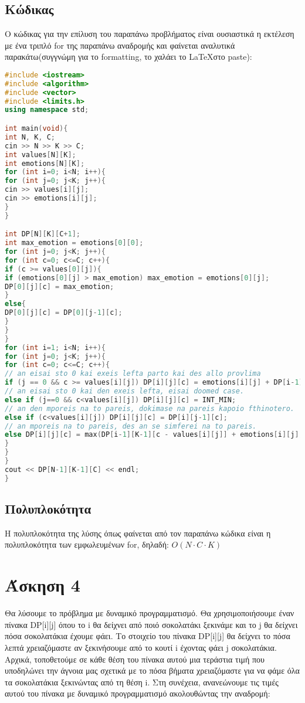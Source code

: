\documentclass[a4paper,oneside, 11pt]{article}
\begin{document}
\subsection*{Κώδικας}
Ο κώδικας για την επίλυση του παραπάνω προβλήματος είναι ουσιαστικά η εκτέλεση με ένα τριπλό for της παραπάνω αναδρομής και φαίνεται αναλυτικά παρακάτω(συγγνώμη για το formatting, το χαλάει το \LaTeX στο paste):
\begin{lstlisting}[language=C++]
#include <iostream>
#include <algorithm>
#include <vector>
#include <limits.h>
using namespace std;

int main(void){
int N, K, C;
cin >> N >> K >> C;
int values[N][K];
int emotions[N][K];
for (int i=0; i<N; i++){
for (int j=0; j<K; j++){
cin >> values[i][j];
cin >> emotions[i][j];
}
}

int DP[N][K][C+1];
int max_emotion = emotions[0][0];
for (int j=0; j<K; j++){
for (int c=0; c<=C; c++){
if (c >= values[0][j]){
if (emotions[0][j] > max_emotion) max_emotion = emotions[0][j];
DP[0][j][c] = max_emotion;
}
else{
DP[0][j][c] = DP[0][j-1][c];
}
}
}
for (int i=1; i<N; i++){
for (int j=0; j<K; j++){
for (int c=0; c<=C; c++){
// an eisai sto 0 kai exeis lefta parto kai des allo provlima
if (j == 0 && c >= values[i][j]) DP[i][j][c] = emotions[i][j] + DP[i-1][K-1][c-values[i][j]];
// an eisai sto 0 kai den exeis lefta, eisai doomed case.
else if (j==0 && c<values[i][j]) DP[i][j][c] = INT_MIN;
// an den mporeis na to pareis, dokimase na pareis kapoio fthinotero.
else if (c<values[i][j]) DP[i][j][c] = DP[i][j-1][c];
// an mporeis na to pareis, des an se simferei na to pareis.
else DP[i][j][c] = max(DP[i-1][K-1][c - values[i][j]] + emotions[i][j], DP[i][j-1][c]);
}
}
}
cout << DP[N-1][K-1][C] << endl;
}

\end{lstlisting}



\subsection*{Πολυπλοκότητα}
Η πολυπλοκότητα της λύσης όπως φαίνεται από τον παραπάνω κώδικα είναι η πολυπλοκότητα των εμφωλευμένων for, δηλαδή:
$O(N\cdot C \cdot K)$
\section*{Άσκηση 4}
Θα λύσουμε το πρόβλημα με δυναμικό προγραμματισμό. Θα χρησιμοποιήσουμε έναν πίνακα DP[i][j] όπου το i θα δείχνει από ποιό σοκολατάκι ξεκινάμε και το j θα δείχνει πόσα σοκολατάκια έχουμε φάει. Το στοιχείο του πίνακα DP[i][j] θα δείχνει το πόσα λεπτά χρειαζόμαστε αν ξεκινήσουμε από το κουτί i έχοντας φάει j σοκολατάκια. Αρχικά, τοποθετούμε σε κάθε θέση του πίνακα αυτού μια τεράστια τιμή που υποδηλώνει την άγνοια μας σχετικά με το πόσα βήματα χρειαζόμαστε για να φάμε όλα τα σοκολατάκια ξεκινώντας από τη θέση i. Στη συνέχεια, ανανεώνουμε τις τιμές αυτού του πίνακα με δυναμικό προγραμματισμό ακολουθώντας την αναδρομή:
\end{document}
